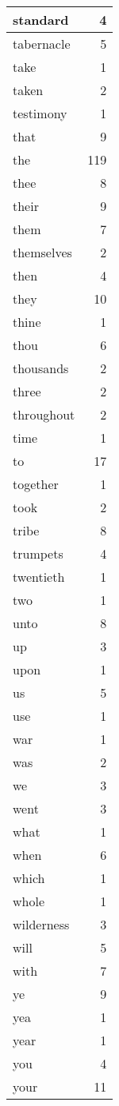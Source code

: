 \begin{center}
\begin{longtable}{l|r}
standard & 4 \\ \hline
tabernacle & 5 \\ \hline
take & 1 \\ \hline
taken & 2 \\ \hline
testimony & 1 \\ \hline
that & 9 \\ \hline
the & 119 \\ \hline
thee & 8 \\ \hline
their & 9 \\ \hline
them & 7 \\ \hline
themselves & 2 \\ \hline
then & 4 \\ \hline
they & 10 \\ \hline
thine & 1 \\ \hline
thou & 6 \\ \hline
thousands & 2 \\ \hline
three & 2 \\ \hline
throughout & 2 \\ \hline
time & 1 \\ \hline
to & 17 \\ \hline
together & 1 \\ \hline
took & 2 \\ \hline
tribe & 8 \\ \hline
trumpets & 4 \\ \hline
twentieth & 1 \\ \hline
two & 1 \\ \hline
unto & 8 \\ \hline
up & 3 \\ \hline
upon & 1 \\ \hline
us & 5 \\ \hline
use & 1 \\ \hline
war & 1 \\ \hline
was & 2 \\ \hline
we & 3 \\ \hline
went & 3 \\ \hline
what & 1 \\ \hline
when & 6 \\ \hline
which & 1 \\ \hline
whole & 1 \\ \hline
wilderness & 3 \\ \hline
will & 5 \\ \hline
with & 7 \\ \hline
ye & 9 \\ \hline
yea & 1 \\ \hline
year & 1 \\ \hline
you & 4 \\ \hline
your & 11 \\ \hline
\end{longtable}
\end{center}



